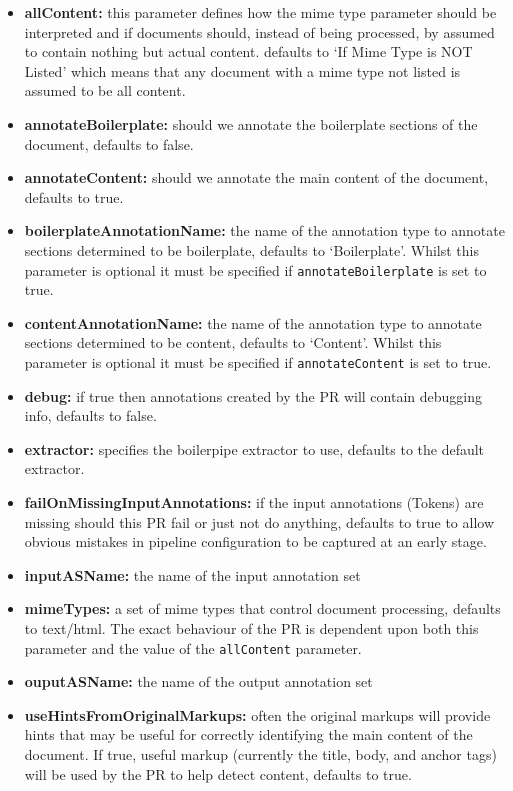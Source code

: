 \begin{itemize}
\item \textbf{allContent:} this parameter defines how the mime type parameter should be interpreted and if documents should, instead of being processed, by assumed to contain nothing but actual content. defaults to `If Mime Type is NOT Listed' which means that any document with a mime type not listed is assumed to be all content.
\item \textbf{annotateBoilerplate:} should we annotate the boilerplate sections of the document, defaults to false.
\item \textbf{annotateContent:} should we annotate the main content of the document, defaults to true.
\item \textbf{boilerplateAnnotationName:} the name of the annotation type to annotate sections determined to be boilerplate, defaults to `Boilerplate'. Whilst this
  parameter is optional it must be specified if \texttt{annotateBoilerplate} is set to true.
\item \textbf{contentAnnotationName:} the name of the annotation type to annotate sections determined to be content, defaults to `Content'. Whilst this
  parameter is optional it must be specified if \texttt{annotateContent} is set to true.
\item \textbf{debug:} if true then annotations created by the PR will contain debugging info, defaults to false.
\item \textbf{extractor:} specifies the boilerpipe extractor to use, defaults to the default extractor.
\item \textbf{failOnMissingInputAnnotations:} if the input annotations (Tokens) are missing should this PR fail or just not do anything, defaults to true to allow
  obvious mistakes in pipeline configuration to be captured at an early stage.
\item \textbf{inputASName:} the name of the input annotation set
\item \textbf{mimeTypes:} a set of mime types that control document processing, defaults to text/html. The exact behaviour of the PR is dependent upon both this
  parameter and the value of the \texttt{allContent} parameter.
\item \textbf{ouputASName:} the name of the output annotation set
\item \textbf{useHintsFromOriginalMarkups:} often the original markups will provide hints that may be useful for correctly identifying the main content of the document.
  If true, useful markup (currently the title, body, and anchor tags) will be used by the PR to help detect content, defaults to true.
\end{itemize}

